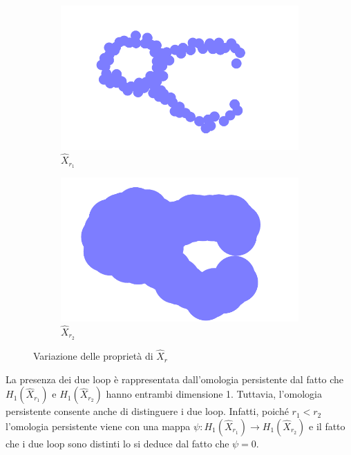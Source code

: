 \begin{figure}[ht]
  \begin{center}
    \begin{subfigure}[b]{.4\textwidth}
      \includegraphics[width=\textwidth]{gfx/double_circle_medium.pdf}
      \caption{$\widehat{X}_{r_1}$}
    \end{subfigure}
    \begin{subfigure}[b]{.4\textwidth}
      \includegraphics[width=\textwidth]{gfx/double_circle_fat.pdf}
      \caption{$\widehat{X}_{r_2}$}
    \end{subfigure}
    \caption{Variazione delle proprietà di $\widehat{X}_r$}  \label{fig2:doublecirclecomparison}
  \end{center}
\end{figure}

 La presenza dei due loop è rappresentata dall'omologia persistente dal fatto che $H_1(\widehat{X}_{r_1})$ e $H_1(\widehat{X}_{r_2})$ hanno entrambi dimensione 1. Tuttavia, l'omologia persistente consente anche di distinguere i due loop. Infatti, poiché $r_1<r_2$ l'omologia persistente viene con una mappa $\psi:H_1(\widehat{X}_{r_1})\to H_1(\widehat{X}_{r_2})$ e il fatto che i due loop sono distinti lo si deduce dal fatto che $\psi=0$.

